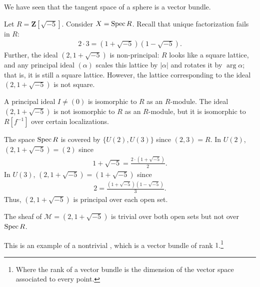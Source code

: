 \documentclass [11 pt, oneside] {article}
\begin{document}
\begin{example}\label{vectb}\text{}
We have seen that the tangent space of a sphere is a vector bundle.

Let $R=\mathbf{Z}\left[ \sqrt{-5}  \right] $. Consider $X=\operatorname{Spec} R$. Recall that unique factorization fails in $R$:
\begin{align*}
	2\cdot 3 = (1+\sqrt{-5} ) (1-\sqrt{-5} ).
\end{align*}
Further, the ideal $(2,1+\sqrt{-5} )$ is non-principal: $R$ looks like a square lattice, and any principal ideal $(\alpha)$ scales this lattice by $\left\lvert \alpha \right\rvert $ and rotates it by $\arg \alpha$; that is, it is still a square lattice. However, the lattice corresponding to the ideal $(2,1+\sqrt{-5} )$ is not square.

A principal ideal $I\ne (0)$ is isomorphic to $R$ as an $R$-module. The ideal $(2,1+\sqrt{-5} )$ is not isomorphic to $R$ as an $R$-module, but it is isomorphic to $R[f^{-1}]$ over certain localizations.

The space $\operatorname{Spec} R$ is covered by $\{U(2),U(3)\}$ since $(2,3)=R$. In $U(2)$, $(2,1+\sqrt{-5} )=(2)$ since 
\begin{align*}
	1+\sqrt{-5}  = \frac{2\cdot(1+\sqrt{-5} )}{2}.
\end{align*}
In $U(3)$, $(2,1+\sqrt{-5} )=(1+\sqrt{-5} )$ since
\begin{align*}
	2 = \frac{(1+\sqrt{-5} ) (1-\sqrt{-5} )}{3}.
\end{align*}
Thus, $(2,1+\sqrt{-5} )$ is principal over each open set.

The sheaf of $\mathscr{M}=(2,1+\sqrt{-5}  )$ is trivial over both open sets but not over $\operatorname{Spec} R$.
\begin{center}
\end{center}
This is an example of a nontrivial , which is a vector bundle of rank $1$.\footnote{Where the rank of a vector bundle is the dimension of the vector space associated to every point.}
\end{example}
\end{document}

